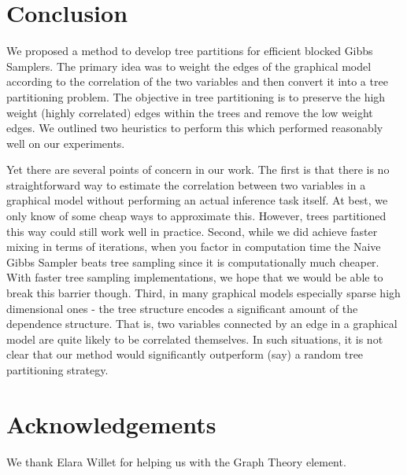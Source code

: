 \documentclass{article} %
\begin{document}
\section{Conclusion}

We proposed a method to develop tree partitions for efficient blocked Gibbs
Samplers. The primary idea was to weight the edges of the graphical model
according to the correlation of the two variables and then convert it into a
tree partitioning problem. The objective in tree partitioning is to preserve the
high weight (highly correlated) edges within the trees and remove the low
weight edges. We outlined two heuristics to perform this which performed
reasonably well on our experiments.

Yet there are several points of concern in our work. The first is that there
is no straightforward way to estimate the correlation between two variables in a
graphical model without performing an actual inference task itself. At best, we
only know of some cheap ways to approximate this. However, trees partitioned
this way could still work well in practice. Second, while we did achieve faster
mixing in terms of iterations, when you factor in computation time the Naive
Gibbs Sampler beats tree sampling since it is computationally much cheaper. With
faster tree sampling implementations, we hope that we would be able to break
this barrier though.
Third, in many graphical models
especially sparse high dimensional ones - the tree structure encodes a
significant amount of the dependence structure. That is, two variables connected
by an edge in a graphical model are quite likely to be correlated themselves. In
such situations, it is not clear that our method would significantly outperform
(say) a random tree partitioning strategy.

\section*{Acknowledgements}
\label{sec:acknowledgement}
We thank Elara Willet for helping us with the Graph Theory element.

 
     
\end{document}
